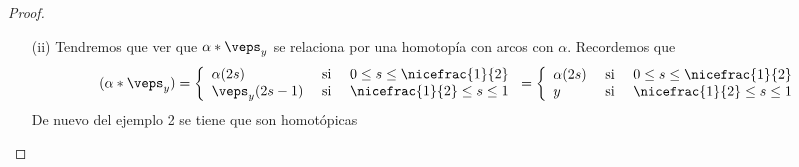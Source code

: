\begin{teo}
\begin{proof}
\begin{enumerate}
            \item[(ii)] Tendremos que ver que $\alpha \ast \veps_y$ se relaciona por una homotopía con arcos con $\alpha$. Recordemos que
            \begin{gather*}
                (\alpha \ast \veps_y) = \left\{
                    \begin{array}{l c c}
                        \alpha(2s) & \text{ si } & 0\leq s \leq \nicefrac{1}{2} \\
                        \veps_y(2s-1) & \text{ si } & \nicefrac{1}{2} \leq s \leq 1
                    \end{array}
                \right. = 
                \left\{
                    \begin{array}{l c c}
                        \alpha(2s) & \text{ si } & 0\leq s \leq \nicefrac{1}{2} \\
                        y & \text{ si } & \nicefrac{1}{2} \leq s \leq 1
                    \end{array}
                \right.
            \end{gather*}
            De nuevo del ejemplo 2 se tiene que son homotópicas


\end{enumerate}
\end{proof}
\end{teo}

